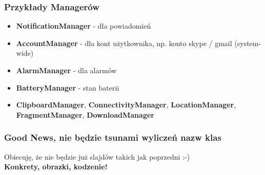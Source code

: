 \begin{frame}\frametitle{Przykłady Managerów}
  \begin{itemize}
    \item \textbf{NotificationManager} - dla powiadomień\\
    \pause \item \textbf{AccountManager} - dla kont użytkownika, np. konto skype / gmail (system-wide)\\
    \pause \item \textbf{AlarmManager} - dla alarmów\\
    \pause \item \textbf{BatteryManager} - stan baterii\\
    \pause \item \textbf{ClipboardManager}, \textbf{ConnectivityManager}, \textbf{LocationManager}, 
                 \textbf{FragmentManager}, \textbf{DownloadManager}
  \end{itemize}
\end{frame}

\begin{frame} \frametitle{Good News, nie będzie tsunami wyliczeń nazw klas}
\begin{center}
 Obiecuję, że nie będzie już slajdów takich jak poprzedni :-) \\
 \textbf{Konkrety, obrazki, kodzenie!}
\end{center}
\end{frame}

